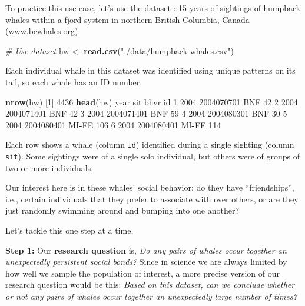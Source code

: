 \documentclass[]{book}
\newenvironment{Shaded}{\begin{snugshade}}{\end{snugshade}}
\newcommand{\CommentTok}[1]{\textcolor[rgb]{0.56,0.35,0.01}{\textit{#1}}}
\newcommand{\DecValTok}[1]{\textcolor[rgb]{0.00,0.00,0.81}{#1}}
\newcommand{\KeywordTok}[1]{\textcolor[rgb]{0.13,0.29,0.53}{\textbf{#1}}}
\newcommand{\NormalTok}[1]{#1}
\newcommand{\OperatorTok}[1]{\textcolor[rgb]{0.81,0.36,0.00}{\textbf{#1}}}
\newcommand{\StringTok}[1]{\textcolor[rgb]{0.31,0.60,0.02}{#1}}
\begin{document}
To practice this use case, let's use the dataset : 15 years of sightings of humpback whales within a fjord system in northern British Columbia, Canada (\url{www.bcwhales.org}).

\begin{Shaded}
\begin{Highlighting}[]
\CommentTok{# Use dataset}
\NormalTok{hw <-}\StringTok{ }\KeywordTok{read.csv}\NormalTok{(}\StringTok{"./data/humpback-whales.csv"}\NormalTok{)}
\end{Highlighting}
\end{Shaded}

Each individual whale in this dataset was identified using unique patterns on its tail, so each whale has an ID number.

\begin{Shaded}
\begin{Highlighting}[]
\KeywordTok{nrow}\NormalTok{(hw)}
\NormalTok{[}\DecValTok{1}\NormalTok{] }\DecValTok{4436}
\KeywordTok{head}\NormalTok{(hw)}
\NormalTok{  year        sit  bhvr  id}
\DecValTok{1} \DecValTok{2004} \DecValTok{2004070701}\NormalTok{   BNF  }\DecValTok{42}
\DecValTok{2} \DecValTok{2004} \DecValTok{2004071401}\NormalTok{   BNF  }\DecValTok{42}
\DecValTok{3} \DecValTok{2004} \DecValTok{2004071401}\NormalTok{   BNF  }\DecValTok{59}
\DecValTok{4} \DecValTok{2004} \DecValTok{2004080301}\NormalTok{   BNF  }\DecValTok{30}
\DecValTok{5} \DecValTok{2004} \DecValTok{2004080401}\NormalTok{ MI}\OperatorTok{-}\NormalTok{FE }\DecValTok{106}
\DecValTok{6} \DecValTok{2004} \DecValTok{2004080401}\NormalTok{ MI}\OperatorTok{-}\NormalTok{FE }\DecValTok{114}
\end{Highlighting}
\end{Shaded}

Each row shows a whale (column \texttt{id}) identified during a single sighting (column \texttt{sit}). Some sightings were of a single solo individual, but others were of groups of two or more individuals.

Our interest here is in these whales' social behavior: do they have ``friendships'', i.e., certain individuals that they prefer to associate with over others, or are they just randomly swimming around and bumping into one another?

Let's tackle this one step at a time.

\textbf{Step 1:} Our \textbf{research question} is, \emph{Do any pairs of whales occur together an unexpectedly persistent social bonds?} Since in science we are always limited by how well we sample the population of interest, a more precise version of our research question would be this: \emph{Based on this dataset, can we conclude whether or not any pairs of whales occur together an unexpectedly large number of times?}
\end{document}
